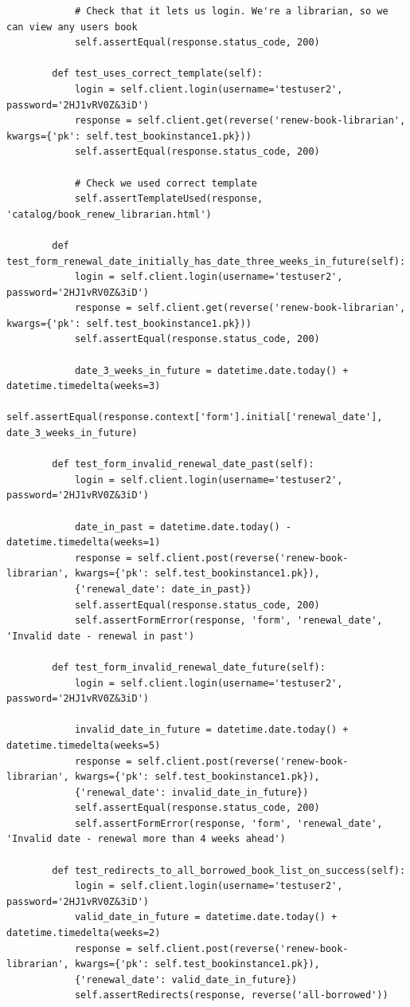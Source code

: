 \documentclass[12pt, a4paper]{report}
\begin{document}
\begin{lstlisting}
			# Check that it lets us login. We're a librarian, so we can view any users book
			self.assertEqual(response.status_code, 200)
	
		def test_uses_correct_template(self):
			login = self.client.login(username='testuser2', password='2HJ1vRV0Z&3iD')
			response = self.client.get(reverse('renew-book-librarian', kwargs={'pk': self.test_bookinstance1.pk}))
			self.assertEqual(response.status_code, 200)
	
			# Check we used correct template
			self.assertTemplateUsed(response, 'catalog/book_renew_librarian.html')
	
		def test_form_renewal_date_initially_has_date_three_weeks_in_future(self):
			login = self.client.login(username='testuser2', password='2HJ1vRV0Z&3iD')
			response = self.client.get(reverse('renew-book-librarian', kwargs={'pk': self.test_bookinstance1.pk}))
			self.assertEqual(response.status_code, 200)
	
			date_3_weeks_in_future = datetime.date.today() + datetime.timedelta(weeks=3)
			self.assertEqual(response.context['form'].initial['renewal_date'], date_3_weeks_in_future)
	
		def test_form_invalid_renewal_date_past(self):
			login = self.client.login(username='testuser2', password='2HJ1vRV0Z&3iD')
	
			date_in_past = datetime.date.today() - datetime.timedelta(weeks=1)
			response = self.client.post(reverse('renew-book-librarian', kwargs={'pk': self.test_bookinstance1.pk}),
			{'renewal_date': date_in_past})
			self.assertEqual(response.status_code, 200)
			self.assertFormError(response, 'form', 'renewal_date', 'Invalid date - renewal in past')
	
		def test_form_invalid_renewal_date_future(self):
			login = self.client.login(username='testuser2', password='2HJ1vRV0Z&3iD')
	
			invalid_date_in_future = datetime.date.today() + datetime.timedelta(weeks=5)
			response = self.client.post(reverse('renew-book-librarian', kwargs={'pk': self.test_bookinstance1.pk}),
			{'renewal_date': invalid_date_in_future})
			self.assertEqual(response.status_code, 200)
			self.assertFormError(response, 'form', 'renewal_date', 'Invalid date - renewal more than 4 weeks ahead')
	
		def test_redirects_to_all_borrowed_book_list_on_success(self):
			login = self.client.login(username='testuser2', password='2HJ1vRV0Z&3iD')
			valid_date_in_future = datetime.date.today() + datetime.timedelta(weeks=2)
			response = self.client.post(reverse('renew-book-librarian', kwargs={'pk': self.test_bookinstance1.pk}),
			{'renewal_date': valid_date_in_future})
			self.assertRedirects(response, reverse('all-borrowed'))
	

\end{lstlisting}
\end{document}
